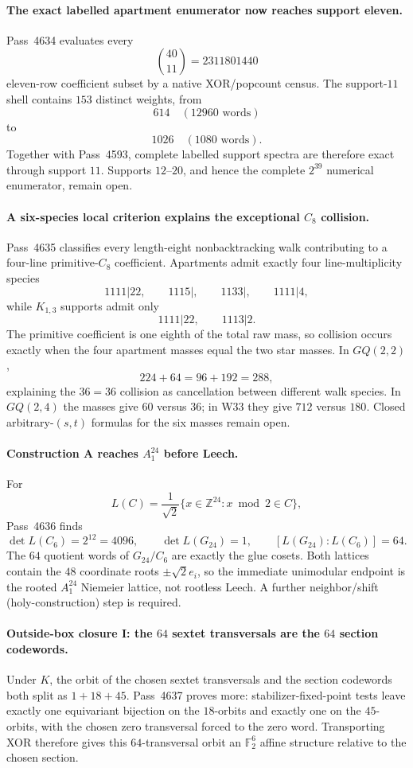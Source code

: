 \paragraph{The exact labelled apartment enumerator now reaches support eleven.}
Pass~4634 evaluates every
\[
 \binom{40}{11}=2311801440
\]
eleven-row coefficient subset by a native XOR/popcount census.  The support-$11$ shell contains $153$ distinct weights, from
\[
 614\quad(12960\text{ words})
\]
to
\[
 1026\quad(1080\text{ words}).
\]
Together with Pass~4593, complete labelled support spectra are therefore exact through support $11$.  Supports $12$--$20$, and hence the complete $2^{39}$ numerical enumerator, remain open.

\paragraph{A six-species local criterion explains the exceptional $C_8$ collision.}
Pass~4635 classifies every length-eight nonbacktracking walk contributing to a four-line primitive-$C_8$ coefficient.  Apartments admit exactly four line-multiplicity species
\[
 1111|22,\qquad1115|,\qquad1133|,\qquad1111|4,
\]
while $K_{1,3}$ supports admit only
\[
 1111|22,\qquad1113|2.
\]
The primitive coefficient is one eighth of the total raw mass, so collision occurs exactly when the four apartment masses equal the two star masses.  In $GQ(2,2)$,
\[
 224+64=96+192=288,
\]
explaining the $36=36$ collision as cancellation between different walk species.  In $GQ(2,4)$ the masses give $60$ versus $36$; in W33 they give $712$ versus $180$.  Closed arbitrary-$(s,t)$ formulas for the six masses remain open.

\paragraph{Construction A reaches $A_1^{24}$ before Leech.}
For
\[
 L(C)=\frac1{\sqrt2}\{x\in\mathbb Z^{24}:x\bmod2\in C\},
\]
Pass~4636 finds
\[
 \det L(C_6)=2^{12}=4096,\qquad \det L(G_{24})=1,\qquad [L(G_{24}):L(C_6)]=64.
\]
The $64$ quotient words of $G_{24}/C_6$ are exactly the glue cosets.  Both lattices contain the $48$ coordinate roots $\pm\sqrt2 e_i$, so the immediate unimodular endpoint is the rooted $A_1^{24}$ Niemeier lattice, not rootless Leech.  A further neighbor/shift (holy-construction) step is required.

\paragraph{Outside-box closure I: the $64$ sextet transversals are the $64$ section codewords.}
Under $K$, the orbit of the chosen sextet transversals and the section codewords both split as $1+18+45$.  Pass~4637 proves more: stabilizer-fixed-point tests leave exactly one equivariant bijection on the $18$-orbits and exactly one on the $45$-orbits, with the chosen zero transversal forced to the zero word.  Transporting XOR therefore gives this $64$-transversal orbit an $\mathbb F_2^6$ affine structure relative to the chosen section.

